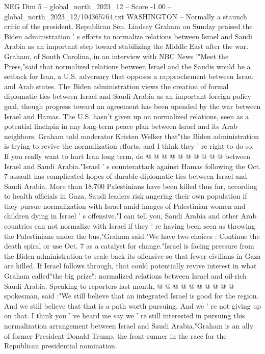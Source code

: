 \begin{textsample}{NEG Dim 5 – global\_north\_2023\_12 – Score -1.00 – global\_north\_2023\_12/104365764.txt}  \label{ex:f5_neg_115}
WASHINGTON -- Normally a staunch critic of the president, Republican Sen.
Lindsey Graham on Sunday praised the Biden administration ' s efforts to normalize relations between Israel and Saudi Arabia as an important step toward stabilizing the Middle East after the war.
Graham, of South Carolina, in an interview with NBC News '"Meet the Press,"said that normalized relations between Israel and the Saudis would be a setback for Iran, a U.S. adversary that opposes a rapprochement between Israel and Arab states.
The Biden administration views the creation of formal diplomatic ties between Israel and Saudi Arabia as an important foreign policy goal, though progress toward an agreement has been upended by the war between Israel and Hamas.
The U.S. hasn't given up on normalized relations, seen as a potential linchpin in any long-term peace plan between Israel and its Arab neighbors.
Graham told moderator Kristen Welker that"the Biden administration is trying to revive the normalization efforts, and I think they ' re right to do so.
If you really want to hurt Iran long term, do @ @ @ @ @ @ @ @ @ @ between Israel and Saudi Arabia."Israel ' s counterattack against Hamas following the Oct. 7 assault has complicated hopes of durable diplomatic ties between Israel and Saudi Arabia.
More than 18,700 Palestinians have been killed thus far, according to health officials in Gaza.
Saudi leaders risk angering their own population if they pursue normalization with Israel amid images of Palestinian women and children dying in Israel ' s offensive."I can tell you, Saudi Arabia and other Arab countries can not normalize with Israel if they ' re having been seen as throwing the Palestinians under the bus,"Graham said."We have two choices : Continue the death spiral or use Oct. 7 as a catalyst for change."Israel is facing pressure from the Biden administration to scale back its offensive so that fewer civilians in Gaza are killed.
If Israel follows through, that could potentially revive interest in what Graham called"the big prize": normalized relations between Israel and oil-rich Saudi Arabia.
Speaking to reporters last month, @ @ @ @ @ @ @ @ @ @ spokesman, said :"We still believe that an integrated Israel is good for the region.
And we still believe that that is a path worth pursuing.
And we ' re not giving up on that.
I think you ' ve heard me say we ' re still interested in pursuing this normalization arrangement between Israel and Saudi Arabia."Graham is an ally of former President Donald Trump, the front-runner in the race for the Republican presidential nomination.

\end{textsample}
